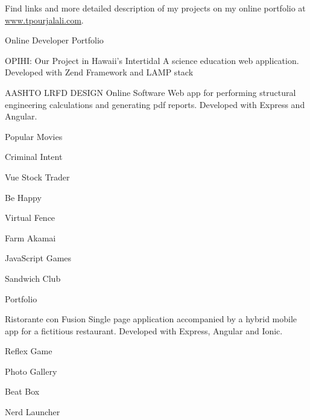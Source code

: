 
	Find links and more detailed description of my projects on my online portfolio at \mbox{\href{http:/www.tpourjalali.com}{www.tpourjalali.com}}.
\begin{cventries}
	
	\cventry
	{\faAndroid\enspace Online Developer Portfolio}
	{}
	{}
	{}
	{}
	
	\cventry
	{\faLaptop \enspace OPIHI: Our Project in Hawaii's Intertidal}
	{}
	{}
	{}
	{A science education web application. Developed with Zend Framework and LAMP stack}
	
	\cventry
	{\faLaptop\enspace AASHTO LRFD DESIGN Online Software}
	{}
	{}
	{}
	{Web app for performing structural engineering calculations and generating pdf reports. Developed with Express and Angular. }
	
	
	\cventry
	{\faAndroid\enspace Popular Movies}
	{}
	{}
	{}
	{}
	
	\cventry
	{\faAndroid\enspace Criminal Intent}
	{}
	{}
	{}
	{}

	\cventry
	{\faAndroid\enspace Vue Stock Trader}
	{}
	{}
	{}
	{}
	
	\cventry
	{\faAndroid\enspace Be Happy}
	{}
	{}
	{}
	{}
	
	\cventry
	{\faAndroid\enspace Virtual Fence}
	{}
	{}
	{}
	{}
	
	\cventry
	{\faAndroid\enspace Farm Akamai}
	{}
	{}
	{}
	{}

	\cventry
	{\faAndroid\enspace JavaScript Games}
	{}
	{}
	{}
	{}
	
	\cventry
	{\faAndroid\enspace Sandwich Club}
	{}
	{}
	{}
	{}
			
	\cventry
	{\faAndroid\enspace Portfolio}
	{}
	{}
	{}
	{}
	
	\cventry
	{\faAndroid \faLaptop\enspace Ristorante con Fusion
	}
	{}
	{}
	{}
	{Single page application accompanied by a hybrid mobile app for a fictitious restaurant. Developed with Express, Angular and Ionic.}
	
	\cventry
	{\faAndroid\enspace Reflex Game}
	{}
	{}
	{}
	{}
	
	\cventry
	{\faAndroid\enspace Photo Gallery}
	{}
	{}
	{}
	{}
	
	\cventry
	{\faAndroid\enspace Beat Box}
	{}
	{}
	{}
	{}
		
	\cventry
	{\faAndroid\enspace Nerd Launcher}
	{}
	{}
	{}
	{}
		
		
		



\end{cventries}
